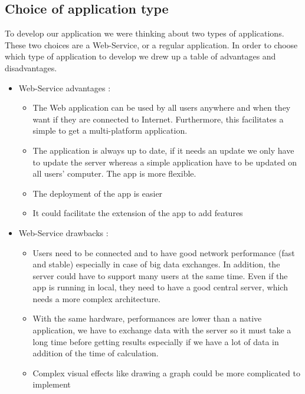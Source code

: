 \subsection{Choice of application type}

To develop our application we were thinking about two types of applications. These two choices are a Web-Service, or a regular application.
In order to choose which type of application to develop we drew up a table of advantages and disadvantages.

\begin{itemize}
    \item Web-Service advantages :
    \begin{itemize}
         \item The Web application can be used by all users anywhere and when they want if they are connected to Internet. Furthermore, this facilitates a simple to get a multi-platform application.
        \item The application is always up to date, if it needs an update we only have to update the server whereas a simple application have to be updated on all users' computer. The app is more flexible.
        \item The deployment of the app is easier
        \item It could facilitate the extension of the app to add features
    \end{itemize}
\end{itemize}

 
 \begin{itemize}
    \item Web-Service drawbacks :
    \begin{itemize}
         \item Users need to be connected and to have good network performance (fast and stable) especially in case of big data exchanges. In addition, the server could have to support many users at the same time. Even if the app is running in local, they need to have a good central server, which needs a more complex architecture.
        \item With the same hardware, performances are lower than a native application, we have to exchange data with the server so it must take a long time before getting results especially if we have a lot of data in addition of the time of calculation.
        \item Complex visual effects like drawing a graph could be more complicated to implement
        
    \end{itemize}
\end{itemize}

